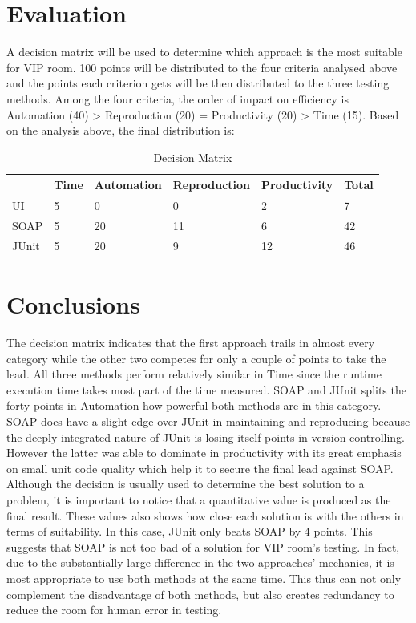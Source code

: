 \documentclass[12pt]{article}
\begin{document}
\section{Evaluation}
A decision matrix will be used to determine which approach is the most suitable for VIP room. 100 points will be distributed to the four criteria analysed above and the points each criterion gets will be then distributed to the three testing methods. Among the four criteria, the order of impact on efficiency is Automation (40) > Reproduction (20) = Productivity (20) > Time (15). Based on the analysis above, the final distribution is:

\begin{table}[h]\centering
\caption{Decision Matrix}
\label{dm}
\begin{tabular}{|l|l|l|l|l|l|}
\hline
      & Time & Automation & Reproduction & Productivity & Total \\ \hline
UI    & 5    & 0          & 0            & 2            & 7     \\ \hline
SOAP  & 5    & 20         & 11           & 6            & 42    \\ \hline
JUnit & 5    & 20         & 9            & 12           & 46    \\ \hline
\end{tabular}
\end{table}

\newpage
\section{Conclusions}
The decision matrix indicates that the first approach trails in almost every category while the other two competes for only a couple of points to take the lead. All three methods perform relatively similar in Time since the runtime execution time takes most part of the time measured. SOAP and JUnit splits the forty points in Automation how powerful both methods are in this category. SOAP does have a slight edge over JUnit in maintaining and reproducing because the deeply integrated nature of JUnit is losing itself points in version controlling.  However the latter was able to dominate in productivity with its great emphasis on small unit code quality which help it to secure the final lead against SOAP.\\

Although the decision is usually used to determine the best solution to a problem, it is important to notice that a quantitative value is produced as the final result. These values also shows how close each solution is with the others in terms of suitability. In this case, JUnit only beats SOAP by 4 points. This suggests that SOAP is not too bad of a solution for VIP room's testing. In fact, due to the substantially large difference in the two approaches' mechanics, it is most appropriate to use both methods at the same time. This thus can not only complement the disadvantage of both methods, but also creates redundancy to reduce the room for human error in testing.\\
\end{document}
